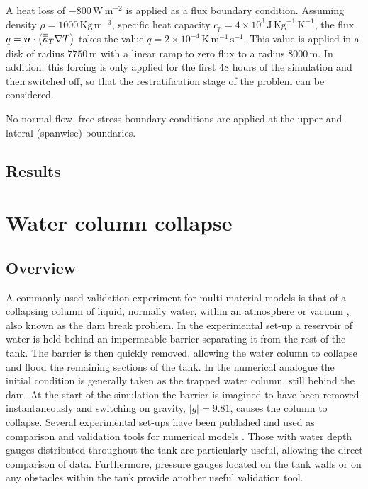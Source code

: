 A heat loss of $-800\,\mathrm{W}\,\mathrm{m}^{-2}$ is
applied as a flux boundary condition. Assuming density $\rho=1000\,\mathrm{Kg}\,\mathrm{m}^{-3}$,
specific heat capacity $c_p=4\times 10^3\,\mathrm{J}\,\mathrm{Kg}^{-1}\,\mathrm{K}^{-1}$,
the flux $q={\mbox{\boldmath$n$}}\cdot\left ( \overline{\overline{\kappa}}_T  \nabla T\right)$
takes the value $q = 2\times 10^{-4}\,\mathrm{K}\,\mathrm{m}^{-1}\,\mathrm{s}^{-1}$.
This value is applied in a disk of radius $7750\,\mathrm{m}$ with a linear ramp to zero flux to a radius
$8000\,\mathrm{m}$. In addition, this forcing is only applied for the first 48 hours of the simulation and
then switched off, so that the restratification stage of the problem can be considered.



No-normal flow, free-stress boundary conditions are applied at the upper and lateral
(spanwise) boundaries.


\subsection{Results}




\section{Water column collapse}

\subsection{Overview}
A commonly used validation experiment for multi-material models is that of a collapsing column of liquid, normally water, within an atmosphere or vacuum \citep{lakehal_interface_2002}, also known as the dam break problem.  In the experimental set-up a reservoir of water is held behind an impermeable barrier separating it from the rest of the tank.  The barrier is then quickly removed, allowing the water column to collapse and flood the remaining sections of the tank.  In the numerical analogue the initial condition is generally taken as the trapped water column, still behind the dam.  At the start of the simulation the barrier is imagined to have been removed instantaneously and switching on gravity, $|g| = 9.81$, causes the column to collapse.   Several experimental set-ups have been published and used as comparison and validation tools for numerical models \citep{martin_part_1952, greaves_simulation_2006}.  Those with water depth gauges distributed throughout the tank are particularly useful, allowing the direct comparison of data.  Furthermore, pressure gauges located on the tank walls or on any obstacles within the tank provide another useful validation tool.


